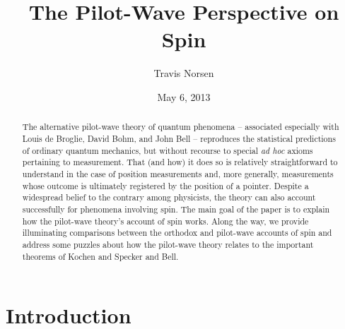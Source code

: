 \documentclass[aps,prc,onecolumn,letterpaper,floatfix,12pt]{revtex4}
\begin{document}
\title{The Pilot-Wave Perspective on Spin}
\author{Travis Norsen}

\date{May 6, 2013}

\begin{abstract}
The alternative pilot-wave theory of quantum phenomena -- associated
especially with Louis de Broglie, David Bohm, and John Bell --
reproduces the statistical predictions of ordinary quantum mechanics,
but without recourse to special \emph{ad hoc} axioms pertaining to measurement.
That (and how) it does so is relatively straightforward to understand in
the case of position measurements and, more generally, measurements
whose outcome is ultimately registered by the position of a
pointer.   Despite a widespread belief to the contrary among
physicists, the theory can also account successfully for phenomena
involving spin.  The main goal of the paper is to explain how the pilot-wave
theory's account of spin works.  Along the way, we provide
illuminating comparisons between the orthodox and pilot-wave accounts
of spin and address some puzzles about how the pilot-wave theory relates to
the important theorems of Kochen and Specker and Bell. 
\end{abstract}


\maketitle

\section{Introduction}
\label{sec1}
\end{document}
